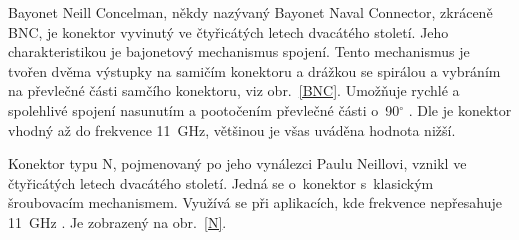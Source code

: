 \documentclass{protokol}
\begin{document}
Bayonet Neill Concelman, někdy nazývaný Bayonet Naval Connector,
zkráceně BNC, je konektor vyvinutý ve čtyřicátých letech dvacátého století.
Jeho charakteristikou je bajonetový mechanismus spojení.
Tento mechanismus je tvořen dvěma výstupky na samičím konektoru
a drážkou se spirálou a vybráním na převlečné části samčího konektoru,
viz obr.~\ref{BNC}.
Umožňuje rychlé a spolehlivé spojení nasunutím a pootočením převlečné
části o~90$^{\circ}$ \cite{czwiki}.
Dle \cite{rfhandbook} je konektor vhodný až do frekvence 11~GHz, většinou je všas uváděna hodnota nižší.

Konektor typu N, pojmenovaný po jeho vynálezci Paulu Neillovi,
vznikl ve čtyřicátých letech dvacátého století.
Jedná se o~konektor s~klasickým šroubovacím mechanismem.
Využívá se při aplikacích, kde frekvence nepřesahuje 11~GHz \cite{rfhandbook}.
Je zobrazený na obr.~\ref{N}.
\end{document}
